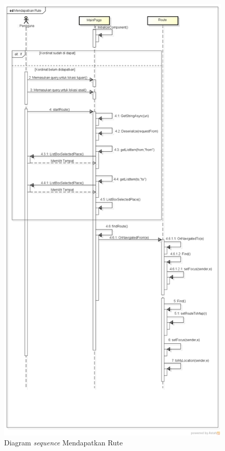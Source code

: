 \begin{figure}[h!]
	\centering
		\includegraphics[scale=0.4]{Gambar/sequence/MendapatkanRute}
	\caption{Diagram \textit{sequence} Mendapatkan Rute}
	\label{fig:sequence rute}
\end{figure}

